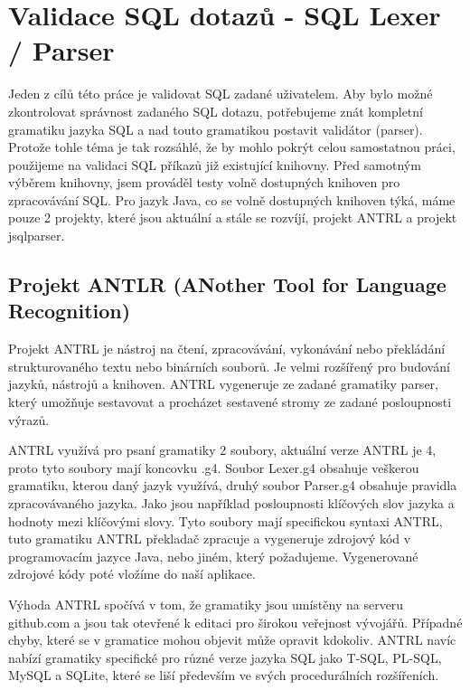 \documentclass[czech,bachelor,public,dept460,male,cpdeclaration,twoside]{diploma}
\begin{document}
\section{Validace SQL dotazů - SQL Lexer / Parser} \label{parsers}
Jeden z cílů této práce je validovat SQL zadané uživatelem. Aby bylo možné zkontrolovat správnost zadaného SQL dotazu, potřebujeme znát kompletní gramatiku jazyka SQL a nad touto gramatikou postavit validátor (parser). Protože tohle téma je tak rozsáhlé, že by mohlo pokrýt celou samostatnou práci, použijeme na validaci SQL příkazů již existující knihovny. Před samotným výběrem knihovny, jsem prováděl testy volně dostupných knihoven pro zpracovávání SQL. Pro jazyk Java, co se volně dostupných knihoven týká, máme pouze 2 projekty, které jsou aktuální a stále se rozvíjí, projekt ANTRL a projekt jsqlparser.


\subsection{Projekt ANTLR (ANother Tool for Language Recognition)}
Projekt ANTRL je nástroj na čtení, zpracovávání, vykonávání nebo překládání strukturovaného textu nebo binárních souborů. Je velmi rozšířený pro budování jazyků, nástrojů a knihoven. ANTRL vygeneruje ze zadané gramatiky parser, který umožňuje sestavovat a procházet sestavené stromy ze zadané posloupnosti výrazů. \cite{antrl}



ANTRL využívá pro psaní gramatiky 2 soubory, aktuální verze ANTRL je 4, proto tyto soubory mají koncovku .g4. Soubor Lexer.g4 obsahuje veškerou gramatiku, kterou daný jazyk využívá, druhý soubor Parser.g4 obsahuje pravidla zpracovávaného jazyka. Jako jsou například posloupnosti klíčových slov jazyka a hodnoty mezi klíčovými slovy. Tyto soubory mají specifickou syntaxi ANTRL, tuto gramatiku ANTRL překladač zpracuje a vygeneruje zdrojový kód v programovacím jazyce Java, nebo jiném, který požadujeme. Vygenerované zdrojové kódy poté vložíme do naší aplikace. \cite{antrldocs}



Výhoda ANTRL spočívá v tom, že gramatiky jsou umístěny na serveru github.com a jsou tak otevřené k editaci pro širokou veřejnost vývojářů. Případné chyby, které se v gramatice mohou objevit může opravit kdokoliv. ANTRL navíc nabízí gramatiky specifické pro různé verze jazyka SQL jako T-SQL, PL-SQL, MySQL a SQLite, které se liší především ve svých procedurálních rozšířeních. \cite{antrlg}
\end{document}

